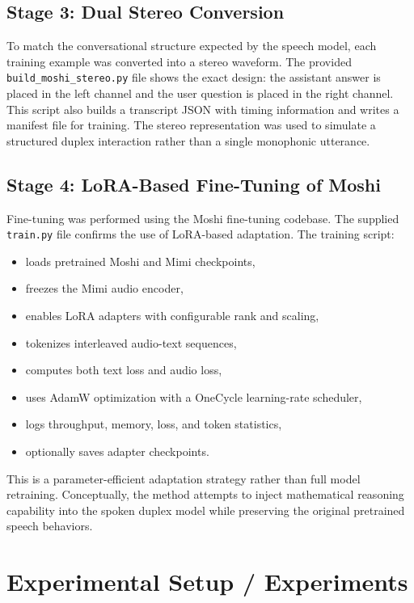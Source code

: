 \documentclass[12pt,a4paper]{article}
\begin{document}
\subsection{Stage 3: Dual Stereo Conversion}
To match the conversational structure expected by the speech model, each training example was converted into a stereo waveform. The provided \texttt{build\_moshi\_stereo.py} file shows the exact design: the assistant answer is placed in the left channel and the user question is placed in the right channel. This script also builds a transcript JSON with timing information and writes a manifest file for training. The stereo representation was used to simulate a structured duplex interaction rather than a single monophonic utterance.

\subsection{Stage 4: LoRA-Based Fine-Tuning of Moshi}
Fine-tuning was performed using the Moshi fine-tuning codebase. The supplied \texttt{train.py} file confirms the use of LoRA-based adaptation. The training script:
\begin{itemize}[leftmargin=1.5em]
    \item loads pretrained Moshi and Mimi checkpoints,
    \item freezes the Mimi audio encoder,
    \item enables LoRA adapters with configurable rank and scaling,
    \item tokenizes interleaved audio-text sequences,
    \item computes both text loss and audio loss,
    \item uses AdamW optimization with a OneCycle learning-rate scheduler,
    \item logs throughput, memory, loss, and token statistics,
    \item optionally saves adapter checkpoints.
\end{itemize}

This is a parameter-efficient adaptation strategy rather than full model retraining. Conceptually, the method attempts to inject mathematical reasoning capability into the spoken duplex model while preserving the original pretrained speech behaviors.

\section{Experimental Setup / Experiments}
\end{document}
